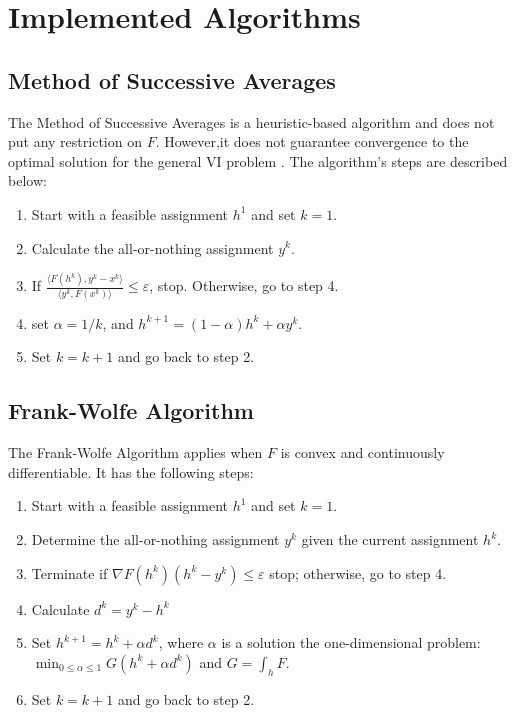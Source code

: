 \documentclass[conference]{IEEEtran}
\renewcommand{\:}{\mathrel{\coloneqq}}
\renewcommand{\=}{\ensuremath{\eqqcolon}}
\renewcommand{\epsilon}{\varepsilon}
\newcommand{\0}{\ensuremath{\boldsymbol{0}}}
\begin{document}
\section{Implemented Algorithms}

\subsection{Method of Successive Averages}
The Method of Successive Averages is a heuristic-based algorithm and does not put any restriction on $F$. However,it does not guarantee convergence to the optimal solution for the general VI problem \cite{nie2010solving}. The algorithm's steps are described below:
\begin{enumerate}
    \item Start with a feasible assignment $h^1$ and set $k=1$.
    \item Calculate the all-or-nothing assignment $y^k$.
    \item If ${\frac {\langle F(h^k),y^k-x^k \rangle} {\langle y^k, F(x^k)\rangle}} \leq
    \epsilon$, stop. Otherwise, go to step 4.
    \item set $\alpha = 1/k$, and $h^{k+1} = (1-\alpha)h^k + \alpha y^k$. 
    \item Set $k = k+1$ and go back to step 2.
\end{enumerate}

\subsection{Frank-Wolfe Algorithm}
The Frank-Wolfe Algorithm applies when $F$ is convex and continuously differentiable. It has the following steps:
\begin{enumerate}
\item Start with a feasible assignment $h^1$ and set $k=1$.
\item Determine the all-or-nothing assignment $y^k$ given the current assignment $h^k$.
\item Terminate if $\nabla F(h^k)(h^k-y^k) \leq \epsilon$ stop; otherwise, go to step 4.
\item Calculate $d^k = y^k - h^k$
\item Set $h^{k+1} = h^k +\alpha d^k$, where $\alpha$ is a solution the one-dimensional problem: $\min_{0 \leq \alpha \leq 1}G(h^k + \alpha d^k)$ and $G = \int_h F$.
\item Set $k = k+1$ and go back to step 2.
\end{enumerate}
\end{document}
